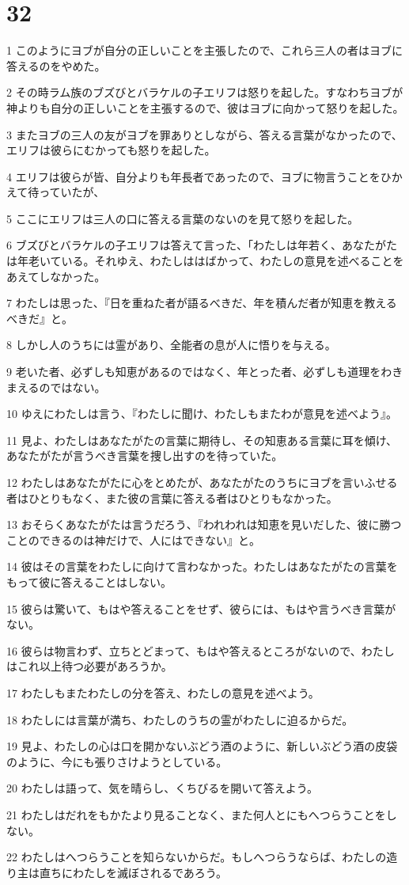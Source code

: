 \chapter{32}

\par 1 このようにヨブが自分の正しいことを主張したので、これら三人の者はヨブに答えるのをやめた。
\par 2 その時ラム族のブズびとバラケルの子エリフは怒りを起した。すなわちヨブが神よりも自分の正しいことを主張するので、彼はヨブに向かって怒りを起した。
\par 3 またヨブの三人の友がヨブを罪ありとしながら、答える言葉がなかったので、エリフは彼らにむかっても怒りを起した。
\par 4 エリフは彼らが皆、自分よりも年長者であったので、ヨブに物言うことをひかえて待っていたが、
\par 5 ここにエリフは三人の口に答える言葉のないのを見て怒りを起した。
\par 6 ブズびとバラケルの子エリフは答えて言った、「わたしは年若く、あなたがたは年老いている。それゆえ、わたしははばかって、わたしの意見を述べることをあえてしなかった。
\par 7 わたしは思った、『日を重ねた者が語るべきだ、年を積んだ者が知恵を教えるべきだ』と。
\par 8 しかし人のうちには霊があり、全能者の息が人に悟りを与える。
\par 9 老いた者、必ずしも知恵があるのではなく、年とった者、必ずしも道理をわきまえるのではない。
\par 10 ゆえにわたしは言う、『わたしに聞け、わたしもまたわが意見を述べよう』。
\par 11 見よ、わたしはあなたがたの言葉に期待し、その知恵ある言葉に耳を傾け、あなたがたが言うべき言葉を捜し出すのを待っていた。
\par 12 わたしはあなたがたに心をとめたが、あなたがたのうちにヨブを言いふせる者はひとりもなく、また彼の言葉に答える者はひとりもなかった。
\par 13 おそらくあなたがたは言うだろう、『われわれは知恵を見いだした、彼に勝つことのできるのは神だけで、人にはできない』と。
\par 14 彼はその言葉をわたしに向けて言わなかった。わたしはあなたがたの言葉をもって彼に答えることはしない。
\par 15 彼らは驚いて、もはや答えることをせず、彼らには、もはや言うべき言葉がない。
\par 16 彼らは物言わず、立ちとどまって、もはや答えるところがないので、わたしはこれ以上待つ必要があろうか。
\par 17 わたしもまたわたしの分を答え、わたしの意見を述べよう。
\par 18 わたしには言葉が満ち、わたしのうちの霊がわたしに迫るからだ。
\par 19 見よ、わたしの心は口を開かないぶどう酒のように、新しいぶどう酒の皮袋のように、今にも張りさけようとしている。
\par 20 わたしは語って、気を晴らし、くちびるを開いて答えよう。
\par 21 わたしはだれをもかたより見ることなく、また何人とにもへつらうことをしない。
\par 22 わたしはへつらうことを知らないからだ。もしへつらうならば、わたしの造り主は直ちにわたしを滅ぼされるであろう。

